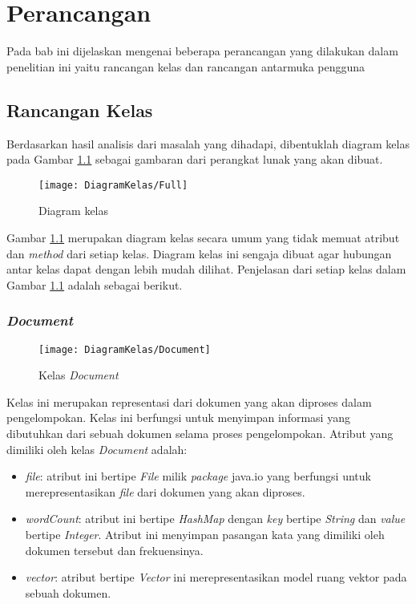 \chapter{Perancangan}
\label{chap:perancangan}

Pada bab ini dijelaskan mengenai beberapa perancangan yang dilakukan dalam penelitian ini yaitu rancangan kelas dan rancangan antarmuka pengguna

\section{Rancangan Kelas}
Berdasarkan hasil analisis dari masalah yang dihadapi, dibentuklah diagram kelas pada Gambar \ref{fig:diagramkelas} sebagai gambaran dari perangkat lunak yang akan dibuat.

\begin{figure}[H]
	\begin{center}
		\texttt{[image: DiagramKelas/Full]}
		\caption{Diagram kelas}
		\label{fig:diagramkelas}
	\end{center}
\end{figure}

Gambar \ref{fig:diagramkelas} merupakan diagram kelas secara umum yang tidak memuat atribut dan \textit{method} dari setiap kelas. Diagram kelas ini sengaja dibuat agar hubungan antar kelas dapat dengan lebih mudah dilihat. Penjelasan dari setiap kelas dalam Gambar \ref{fig:diagramkelas} adalah sebagai berikut.

\subsection{\textit{Document}}

\begin{figure}[H]
	\begin{center}
		\texttt{[image: DiagramKelas/Document]}
		\caption{Kelas \textit{Document}}
		\label{fig:kelasDocument}
	\end{center}
\end{figure}

Kelas ini merupakan representasi dari dokumen yang akan diproses dalam pengelompokan. Kelas ini berfungsi untuk menyimpan informasi yang dibutuhkan dari sebuah dokumen selama proses pengelompokan. Atribut yang dimiliki oleh kelas \textit{Document} adalah:

\begin{itemize}
	\item \textit{file}: atribut ini bertipe \textit{File} milik \textit{package} java.io yang berfungsi untuk merepresentasikan \textit{file} dari dokumen yang akan diproses.
	\item \textit{wordCount}: atribut ini bertipe \textit{HashMap} dengan \textit{key} bertipe \textit{String} dan \textit{value} bertipe \textit{Integer}. Atribut ini menyimpan pasangan kata yang dimiliki oleh dokumen tersebut dan frekuensinya.
	\item \textit{vector}: atribut bertipe \textit{Vector} ini merepresentasikan model ruang vektor pada sebuah dokumen.
\end{itemize}

